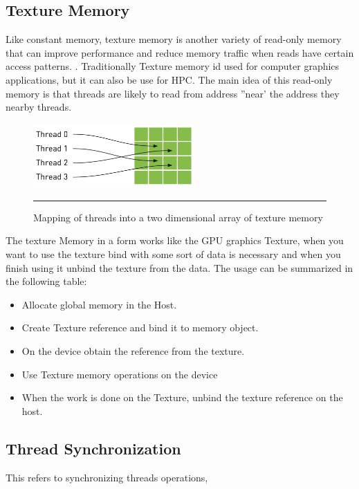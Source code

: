 \subsection{Texture Memory}

Like constant memory, texture memory is another variety of read-only memory that can improve performance and reduce memory traffic when reads have certain access patterns. . Traditionally Texture memory id used for computer graphics applications, but it can also be use for HPC. The main idea of this read-only memory is that threads are likely to read from address ''near' the address they nearby threads.\cite{example}


\begin{figure}[htbp]
	\centering
		\includegraphics[width=0.55\textwidth]{Figures/texture.png}
		\rule{35em}{0.5pt}
	\caption[Texture Memory]{Mapping of threads into a two dimensional array of texture memory}
	\label{fig:texture}
\end{figure}

The texture Memory in a form works like the GPU graphics Texture, when you want to use the texture bind with some sort of data is necessary and when you finish using it unbind the texture from the data. The usage can be summarized in the following table:

\begin{itemize}
\item Allocate global memory in the Host.
\item Create Texture reference and bind it to memory object.
\item On the device obtain the reference from the texture.
\item  Use Texture memory operations on the device
\item  When the work is done on the Texture, unbind the texture reference on the host.
\end{itemize}

\subsection{Thread Synchronization}

This refers to synchronizing threads operations,


